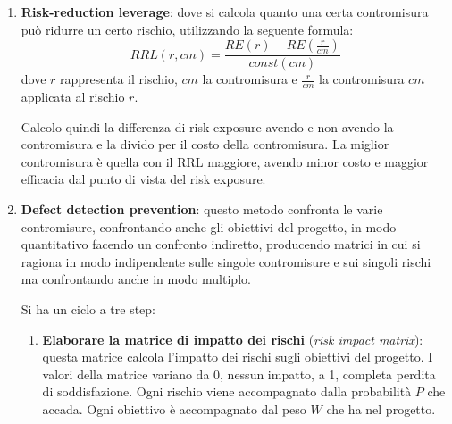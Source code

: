 \begin{enumerate}
    \item \textbf{Risk-reduction leverage}: dove si calcola quanto una certa
          contromisura può ridurre un certo rischio, utilizzando la seguente formula:
          \begin{equation}
              RRL(r, cm) = \frac{RE(r) - RE(\frac{r}{cm})}{const(cm)}
          \end{equation}
          dove $r$ rappresenta il rischio, $cm$ la contromisura e $\frac{r}{cm}$ la
          contromisura $cm$ applicata al rischio $r$.

          Calcolo quindi la differenza di risk exposure avendo e non avendo la contromisura
          e la divido per il costo della contromisura. La miglior contromisura è quella
          con il RRL maggiore, avendo minor costo e maggior efficacia dal punto di vista
          del risk exposure.
    \item \textbf{Defect detection prevention}: questo metodo confronta le varie
          contromisure, confrontando anche gli obiettivi del progetto, in modo
          quantitativo facendo un confronto indiretto, producendo matrici in cui
          si ragiona in modo indipendente sulle singole contromisure e sui singoli
          rischi ma confrontando anche in modo multiplo.

          Si ha un ciclo a tre step:
          \begin{enumerate}
              \item \textbf{Elaborare la matrice di impatto dei rischi} (\textit{risk
                        impact matrix}): questa matrice calcola l'impatto dei
                    rischi sugli obiettivi del progetto. I valori della matrice
                    variano da 0, nessun impatto, a 1, completa perdita di
                    soddisfazione. Ogni rischio viene accompagnato dalla
                    probabilità $P$ che accada. Ogni obiettivo è accompagnato
                    dal peso $W$ che ha nel progetto.


\end{enumerate}
\end{enumerate}
